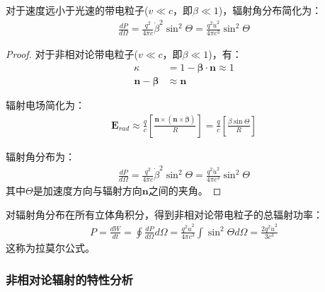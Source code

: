 \begin{theorem}[非相对论近似下的辐射角分布]
对于速度远小于光速的带电粒子($v \ll c$，即$\beta \ll 1$)，辐射角分布简化为：
\begin{align}
\frac{dP}{d\Omega} = \frac{q^2}{4\pi c} \dot{\beta}^2 \sin^2\Theta
= \frac{q^2 \dot{u}^2}{4\pi c^3} \sin^2\Theta
\end{align}
\end{theorem}
\begin{proof}
对于非相对论带电粒子($v \ll c$，即$\beta \ll 1$)，有：
\begin{align}
\kappa &= 1 - \boldsymbol{\beta} \cdot \mathbf{n} \approx 1 \\
\mathbf{n} - \boldsymbol{\beta} &\approx \mathbf{n}
\end{align}

辐射电场简化为：
\begin{align}
\mathbf{E}_{rad} \approx \frac{q}{c} \left[\frac{\mathbf{n} \times (\mathbf{n} \times \dot{\boldsymbol{\beta}})}{R}\right] 
= \frac{q}{c} \left[\frac{\dot{\beta}\sin\Theta}{R}\right]
\end{align}

辐射角分布为：
\begin{align}
\frac{dP}{d\Omega} = \frac{q^2}{4\pi c} \dot{\beta}^2 \sin^2\Theta
= \frac{q^2 \dot{u}^2}{4\pi c^3} \sin^2\Theta
\end{align}
其中$\Theta$是加速度方向与辐射方向$\mathbf{n}$之间的夹角。
\end{proof}


\begin{theorem}
对辐射角分布在所有立体角积分，得到非相对论带电粒子的总辐射功率：
\begin{align}
P = \frac{dW}{dt} = \oint \frac{dP}{d\Omega} d\Omega 
= \frac{q^2 \dot{u}^2}{4\pi c^3} \int \sin^2\Theta d\Omega
= \frac{2q^2 \dot{u}^2}{3c^3}
\end{align}
这称为拉莫尔公式。
\end{theorem}


\subsubsection{非相对论辐射的特性分析}

